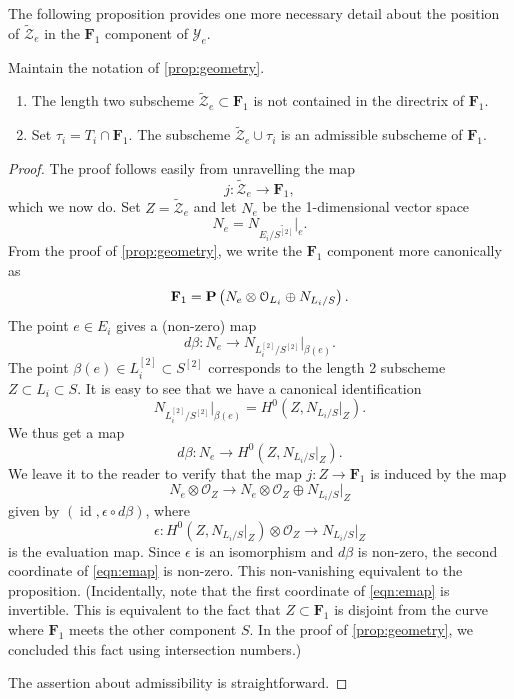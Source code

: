 \documentclass[11pt,reqno, letterpaper]{amsart}
\DeclareMathOperator{\id}{id}
\renewcommand{\to}{{\longrightarrow}}
\numberwithin{equation}{section}
\renewcommand{\O}{\mathcal O}
\newcommand{\F}{\mathbf F}
\newcommand{\td}{\widetilde}
\begin{document}
The following proposition provides one more necessary detail about the position of $\widetilde {\mathcal Z}_e$ in the $\F_1$ component of $\mathcal Y_e$.
\begin{proposition}
  \label{prop:nodirectrix}
  Maintain the notation of \autoref{prop:geometry}.
  \begin{enumerate}
  \item The length two
    subscheme $\td{\mathcal{Z}}_{e} \subset \F_{1}$ is not contained in the directrix of $\F_{1}$.
  \item Set $\tau_i = T_i \cap \F_1$.
    The subscheme $\td{\mathcal Z}_e \cup \tau_i$ is an admissible subscheme of $\F_1$.
  \end{enumerate}
\end{proposition}
\begin{proof}
  The proof follows easily from unravelling the map
  \[ j \colon \widetilde {\mathcal Z}_e \to \F_1,\]
  which we now do.
  Set $Z = \widetilde{\mathcal Z}_e$ and let $N_e$ be the 1-dimensional vector space
  \[ N_e = N_{E_i/\widetilde{S^{[2]}}} \big|_e. \]
  From the proof of \autoref{prop:geometry}, we write the $\F_1$ component more canonically as
  \[
    \F_1 = \P\left(N_e \otimes \O_{L_i} \oplus N_{L_i/S}\right).
  \]
  The point $e \in E_i$ gives a (non-zero) map
  \[
    d \beta \colon N_e \to N_{L^{[2]}_i / S^{[2]}}|_{\beta(e)}.
  \]
  The point $\beta(e) \in L^{[2]}_i \subset S^{[2]}$ corresponds to the length 2 subscheme $Z \subset L_i \subset S$.
  It is easy to see that we have a canonical identification
  \[
    N_{L^{[2]}_i / S^{[2]}}\big |_{\beta(e)} = H^0\left(Z, N_{L_i/S}|_Z\right).
  \]
  We thus get a map
  \[
    d \beta \colon N_e \to H^0\left(Z, N_{L_i/S}|_Z\right).
  \]
  We leave it to the reader to verify that the map $j \colon Z \to \F_1$ is induced by the map
  \begin{equation}\label{eqn:emap}
    N_e \otimes \O_Z \to N_e \otimes \O_Z \oplus N_{L_i/S}|_Z
  \end{equation}
  given by $(\id, \epsilon \circ d\beta)$, where
  \[
    \epsilon \colon H^0\left(Z, N_{L_i/S}|_Z\right) \otimes \O_Z \to N_{L_i/S}|_Z
  \]
  is the evaluation map.
  Since $\epsilon$ is an isomorphism and $d \beta$ is non-zero, the second coordinate of \eqref{eqn:emap} is non-zero.
  This non-vanishing equivalent to the proposition.
  (Incidentally, note that the first coordinate of \eqref{eqn:emap} is invertible.
  This is equivalent to the fact that $Z \subset \F_1$ is disjoint from the curve where $\F_1$ meets the other component $S$.
  In the proof of \autoref{prop:geometry}, we concluded this fact using intersection numbers.)

  The assertion about admissibility is straightforward.
\end{proof}
\end{document}
